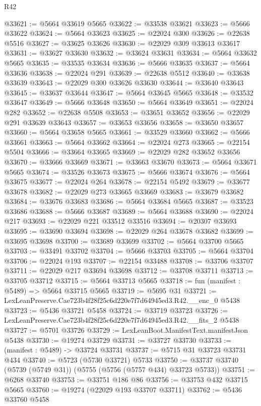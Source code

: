 \begin{lexlean}{R42}
\begin{coremodule}
@33621 := @5664 @33619 @5665
@33622 := @33538 @33621
@33623 := @5666 @33622
@33624 := @5664 @33623
@33625 := @22024 @300
@33626 := @22638 @5516
@33627 := @33625 @33626
@33630 := @22029 @309 @33613 @33617
@33631 := @33627 @33630
@33632 := @33624 @33631
@33634 := @5664 @33632 @5665
@33635 := @33535 @33634
@33636 := @5666 @33635
@33637 := @5664 @33636
@33638 := @22024 @291
@33639 := @22638 @5512
@33640 := @33638 @33639
@33643 := @22029 @300 @33626 @33630
@33644 := @33640 @33643
@33645 := @33637 @33644
@33647 := @5664 @33645 @5665
@33648 := @33532 @33647
@33649 := @5666 @33648
@33650 := @5664 @33649
@33651 := @22024 @282
@33652 := @22638 @5508
@33653 := @33651 @33652
@33656 := @22029 @291 @33639 @33643
@33657 := @33653 @33656
@33658 := @33650 @33657
@33660 := @5664 @33658 @5665
@33661 := @33529 @33660
@33662 := @5666 @33661
@33663 := @5664 @33662
@33664 := @22024 @273
@33665 := @22154 @5504
@33666 := @33664 @33665
@33669 := @22029 @282 @33652 @33656
@33670 := @33666 @33669
@33671 := @33663 @33670
@33673 := @5664 @33671 @5665
@33674 := @33526 @33673
@33675 := @5666 @33674
@33676 := @5664 @33675
@33677 := @22024 @264
@33678 := @22154 @5492
@33679 := @33677 @33678
@33682 := @22029 @273 @33665 @33669
@33683 := @33679 @33682
@33684 := @33676 @33683
@33686 := @5664 @33684 @5665
@33687 := @33523 @33686
@33688 := @5666 @33687
@33689 := @5664 @33688
@33690 := @22024 @217
@33693 := @22029 @221 @33512 @33516
@33694 := @20307 @33693
@33695 := @33690 @33694
@33698 := @22029 @264 @33678 @33682
@33699 := @33695 @33698
@33700 := @33689 @33699
@33702 := @5664 @33700 @5665
@33703 := @33491 @33702
@33704 := @5666 @33703
@33705 := @5664 @33704
@33706 := @22024 @193
@33707 := @22154 @33488
@33708 := @33706 @33707
@33711 := @22029 @217 @33694 @33698
@33712 := @33708 @33711
@33713 := @33705 @33712
@33715 := @5664 @33713 @5665
@33718 := fun (manifest : @5489) => @5664 @33715 @5665
@33719 := @5695 @31
@33721 := LexLeanPreserve.Cae723b4f28f25c6d220e7f7d64945ed3.R42.__enc_0 @5438
@33723 := @5436 @33721 @5458
@33724 := @33719 @33723
@33726 := LexLeanPreserve.Cae723b4f28f25c6d220e7f7d64945ed3.R42.__fits_2 @5438
@33727 := @5701 @33726
@33729 := LexLeanBoot.ManifestText.manifestJson @5438
@33730 := @19274 @33729
@33731 := @33727 @33730
@33733 := (manifest : @5489) -> @33724 @33731
@33737 := @5715 @31 @33723 @33731 @434
@33740 := @5723 (@5730 @33721) @5733
@33750 := @33737 @33740 (@5739 (@5749 @31)) (@5755 (@5756 (@5757 @434) @33723 @5733))
@33751 := @6268 @33740
@33753 := @33751 @186 @86
@33756 := @33753 @432 @33715 @5665
@33760 := @19274 (@22029 @193 @33707 @33711)
@33762 := @5436 @33760 @5458

\end{coremodule}
\end{lexlean}
